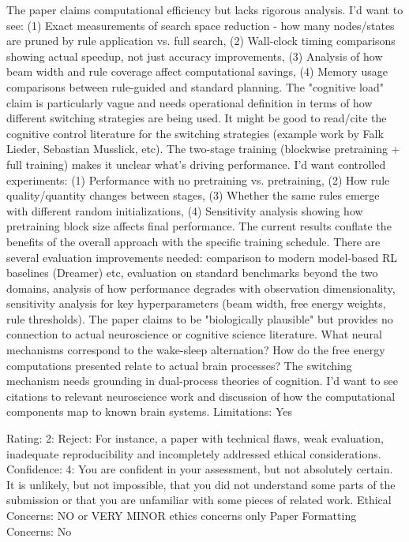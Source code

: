 The paper claims computational efficiency but lacks rigorous analysis. I'd want to see: (1) Exact measurements of search space reduction - how many nodes/states are pruned by rule application vs. full search, (2) Wall-clock timing comparisons showing actual speedup, not just accuracy improvements, (3) Analysis of how beam width and rule coverage affect computational savings, (4) Memory usage comparisons between rule-guided and standard planning. The "cognitive load" claim is particularly vague and needs operational definition in terms of how different switching strategies are being used. It might be good to read/cite the cognitive control literature for the switching strategies (example work by Falk Lieder, Sebastian Musslick, etc).
The two-stage training (blockwise pretraining + full training) makes it unclear what's driving performance. I'd want controlled experiments: (1) Performance with no pretraining vs. pretraining, (2) How rule quality/quantity changes between stages, (3) Whether the same rules emerge with different random initializations, (4) Sensitivity analysis showing how pretraining block size affects final performance. The current results conflate the benefits of the overall approach with the specific training schedule.
There are several evaluation improvements needed: comparison to modern model-based RL baselines (Dreamer) etc, evaluation on standard benchmarks beyond the two domains, analysis of how performance degrades with observation dimensionality, sensitivity analysis for key hyperparameters (beam width, free energy weights, rule thresholds).
The paper claims to be "biologically plausible" but provides no connection to actual neuroscience or cognitive science literature. What neural mechanisms correspond to the wake-sleep alternation? How do the free energy computations presented relate to actual brain processes? The switching mechanism needs grounding in dual-process theories of cognition. I'd want to see citations to relevant neuroscience work and discussion of how the computational components map to known brain systems.
Limitations:
Yes

Rating: 2: Reject: For instance, a paper with technical flaws, weak evaluation, inadequate reproducibility and incompletely addressed ethical considerations.
Confidence: 4: You are confident in your assessment, but not absolutely certain. It is unlikely, but not impossible, that you did not understand some parts of the submission or that you are unfamiliar with some pieces of related work.
Ethical Concerns: NO or VERY MINOR ethics concerns only
Paper Formatting Concerns:
No


